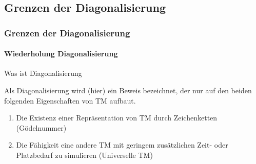 \subsection[Grenzen der Diagonalisierung]{Grenzen der Diagonalisierung}
\begin{frame}
	\frametitle{Grenzen der Diagonalisierung}
	\framesubtitle{Wiederholung Diagonalisierung}
	\begin{KITinfoblock}{Was ist Diagonalisierung} {
			Als Diagonalisierung wird (hier) ein Beweis bezeichnet, der nur auf den beiden folgenden
			Eigenschaften von TM aufbaut.
			
			\begin{enumerate}
				\item<2-> Die Existenz einer Repräsentation von TM durch Zeichenketten (Gödelnummer)
				\item<3-> Die Fähigkeit eine andere TM mit geringem zusätzlichen Zeit- oder Platzbedarf zu simulieren (Universelle TM)
			\end{enumerate}		
		}
	\end{KITinfoblock}
\end{frame}

